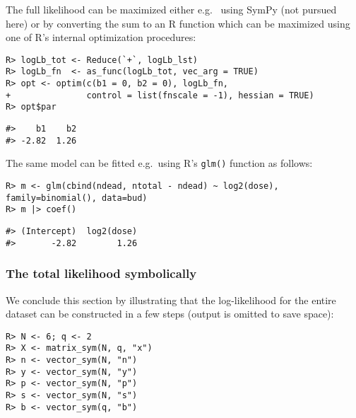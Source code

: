 The full likelihood can be maximized either e.g.~
using SymPy (not pursued here) or by converting the sum to an R
function which can be maximized using one of R's internal
optimization procedures:

\begin{verbatim}
R> logLb_tot <- Reduce(`+`, logLb_lst) 
R> logLb_fn  <- as_func(logLb_tot, vec_arg = TRUE)
R> opt <- optim(c(b1 = 0, b2 = 0), logLb_fn, 
+               control = list(fnscale = -1), hessian = TRUE)
R> opt$par
\end{verbatim}

\begin{verbatim}
#>    b1    b2 
#> -2.82  1.26
\end{verbatim}

The same model can be fitted e.g.~using R's \texttt{glm()} function as follows:

\begin{verbatim}
R> m <- glm(cbind(ndead, ntotal - ndead) ~ log2(dose), family=binomial(), data=bud)
R> m |> coef()
\end{verbatim}

\begin{verbatim}
#> (Intercept)  log2(dose) 
#>       -2.82        1.26
\end{verbatim}

\hypertarget{the-total-likelihood-symbolically}{%
\subsubsection{The total likelihood symbolically}\label{the-total-likelihood-symbolically}}

We conclude this section by illustrating that the log-likelihood for the entire dataset
can be constructed in a few steps (output is omitted to save space):

\begin{verbatim}
R> N <- 6; q <- 2
R> X <- matrix_sym(N, q, "x")
R> n <- vector_sym(N, "n")
R> y <- vector_sym(N, "y")
R> p <- vector_sym(N, "p")
R> s <- vector_sym(N, "s")
R> b <- vector_sym(q, "b")
\end{verbatim}

